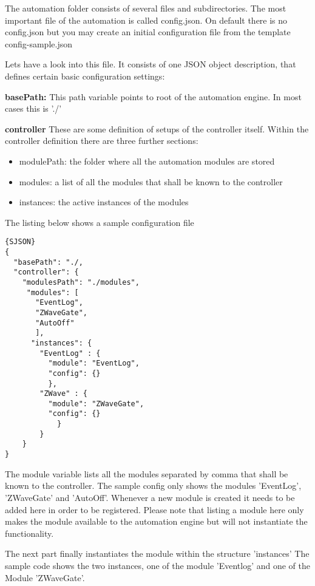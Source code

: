 The automation folder consists of several files and subdirectories. The most important 
file of the automation is called config.json. On default there is no config.json but 
you may create an initial configuration file from the template config-sample.json

Lets have a look into this file. It consists of one JSON object description, that defines certain basic configuration settings:

{\bf basePath:} This path variable points to root of the automation engine. In most cases this is './'


{\bf controller} These are some definition of setups of the controller itself. Within the controller
definition there are three further sections:

\begin{itemize}
\item modulePath: the folder where all the automation modules are stored
\item modules: a list of all the modules that shall be known to the controller
\item instances: the active instances of the modules
\end{itemize}

The listing below shows a sample configuration file

\begin{lstlisting}[caption=Sample JSON Config File]{SJSON}
{
  "basePath": "./,
  "controller": {
    "modulesPath": "./modules",
     "modules": [
       "EventLog",
       "ZWaveGate",
       "AutoOff"
       ],
      "instances": {
        "EventLog" : {
          "module": "EventLog",
          "config": {}
          },
        "ZWave" : {
          "module": "ZWaveGate",
          "config": {}
            }
        }
    }
}
\end{lstlisting}

The module variable lists all the modules separated by comma that shall be known to the controller. The sample config only shows the modules 'EventLog', 'ZWaveGate' and 'AutoOff'. Whenever a new module is 
created it needs to be added here in order to be registered. Please note that listing 
a module here only makes the module available to the automation engine 
but will not instantiate the functionality.

The next part finally instantiates the module within the structure 'instances' The sample 
code shows the two instances, one of the module 'Eventlog' and one of the Module 'ZWaveGate'.

